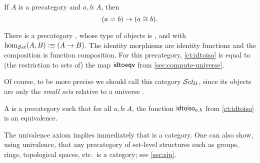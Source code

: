 \documentclass[hott-all.tex]{subfiles}
\begin{document}
%

\begin{lem}\label{ct:idtoiso}
  If $A$ is a precategory and $a,b:A$, then
  \[(a =_{} b)\to (a \cong b).\]
\end{lem}


\begin{eg}\label{ct:precatset}
  There is a precategory \uset, whose type of objects is \set, and with $\hom_{\mathcal{S}et}(A,B) \vcentcolon\equiv (A\to B)$.
  The identity morphisms are identity functions and the composition is function composition.
  For this precategory, \cref{ct:idtoiso} is equal to (the restriction to sets of) the map $\mathsf{idtoeqv}$ from \cref{sec:compute-universe}.

  Of course, to be more precise we should call this category $\mathcal{S}et_\mathcal{U}$, since its objects are only the \emph{small sets}
  relative to a universe \UU.
\end{eg}


\begin{defn}\label{ct:category}
  A 
  is a precategory such that for all $a,b:A$, the function $\mathsf{idtoiso}_{a,b}$ from \cref{ct:idtoiso} is an equivalence.
\end{defn}


\begin{eg}\label{ct:eg:set}
  The univalence axiom implies immediately that \uset is a category.
  One can also show, using univalence, that any precategory of set-level structures such as groups, rings, topological spaces, etc.\ is a category; see \cref{sec:sip}.
\end{eg}
\end{document}

